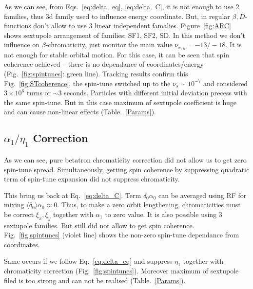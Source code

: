 \documentclass[a4paper,
               keeplastbox,   %
               ]{jacow}
\begin{document}
\par As we can see, from Eqs.~\ref{eq:delta_eq}, \ref{eq:delta_C}, it is not enough to use 2 families, thus 3d family used to influence energy coordinate. But, in regular $\beta, D$-functions don't allow to use 3 linear independent famalies. Figure~\ref{fig:ARC} shows sextupole arrangement of families: SF1, SF2, SD. In this method we don't influence on $\beta$-chromaticity, just monitor the main value $\nu_{x,y} = -13/-18$. It is not enough for stable orbital motion. For this case, it can be seen that spin coherence achieved – there is no dependance of coordinates/energy (Fig.~\ref{fig:spintunes}: green line). Tracking results confirm this Fig.~\ref{fig:STcoherence}, the spin-tune switched up to the $\nu_{s} \sim 10^{-7}$ and considered $3\times10^{6}$ turns or $\sim3$ seconds. Particles with different initial deviation precess with the same spin-tune. But in this case maximum of sextupole coefficient is huge and can cause non-linear effects (Table.~\ref{Params}).

\subsection{$\alpha_{1}/\eta_{1}$ Correction}

\par As we can see, pure betatron chromaticity correction did not allow us to get zero spin-tune spread. Simultaneously, getting spin coherence by suppressing quadratic term of spin-tune expansion did not suppress chromaticity.
\par This bring us back at Eq.~\ref{eq:delta_C}. Term $\delta_{0} \alpha_{0}$ can be averaged using RF for mixing $\langle\delta_{0}\rangle \alpha_{0} \approx 0$. Thus, to make a zero orbit lengthening, chromaticities must be correct $\xi_x, \xi_{y}$ together with $\alpha_{1}$ to zero value. It is also possible using 3 sextupole families. But still did not allow to get spin coherence. Fig.~\ref{fig:spintunes} (violet line) shows the non-zero spin-tune dependance from coordinates.
\par Same occurs if we follow Eq.~\ref{eq:delta_eq} and suppress $\eta_{1}$ together with chromaticity correction (Fig.~\ref{fig:spintunes}). Moreover maximum of sextupole filed is too strong and can not be realised (Table.~\ref{Params}).
\end{document}
